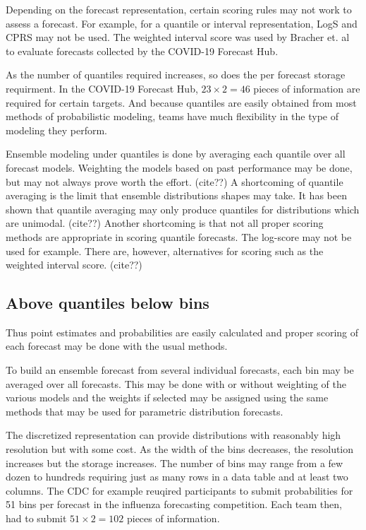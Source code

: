 \documentclass{article}\usepackage[]{graphicx}\usepackage[]{color}
\begin{document}
Depending on the forecast representation, certain scoring rules may not work to 
assess a forecast. For example, for a quantile or interval representation, LogS
and CPRS may not be used. The weighted interval score was used by Bracher et. al
to evaluate forecasts collected by the COVID-19 Forecast Hub. 
\cite{bracher2021evaluating}







As the number of quantiles required increases, so does the per forecast storage 
requirment. In the COVID-19 Forecast Hub, $23\times 2 = 46$ pieces of 
information are required for certain targets. And because quantiles are easily 
obtained from most methods of probabilistic modeling, teams have much 
flexibility in the type of modeling they perform. 

Ensemble modeling under quantiles is done by averaging each quantile over all 
forecast models. Weighting the models based on past performance may be done, but
may not always prove worth the effort. (cite??) A shortcoming of quantile
averaging is the limit that ensemble distributions shapes may take. It has been
shown that quantile averaging may only produce quantiles for distributions which
are unimodal. (cite??) Another shortcoming is that not all proper scoring
methods are appropriate in scoring quantile forecasts. The log-score may not be 
used for example. There are, however, alternatives for scoring such as the
weighted interval score. (cite??)

\subsection*{Above quantiles below bins}

Thus point estimates and
probabilities are easily calculated and proper scoring of each forecast may be 
done with the usual methods. 

To build an ensemble forecast from several individual forecasts, each bin may be
averaged over all forecasts. This may be done with or without weighting of the 
various models and the weights if selected may be assigned using the same 
methods that may be used for parametric distribution forecasts.

The discretized representation can provide distributions with reasonably high
resolution but with some cost. As the width of the bins decreases, the 
resolution increases but the storage increases. The number of bins may range 
from a few dozen to hundreds requiring just as many rows in a data table and at 
least two columns. The CDC for example reuqired participants to submit 
probabilities for 51 bins per forecast in the influenza forecasting competition. 
Each team then, had to submit $51\times2 = 102$ pieces of information.
\end{document}

